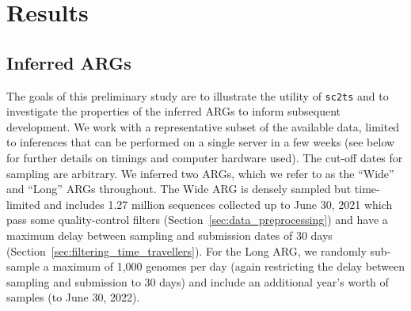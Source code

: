 \documentclass{article}
\begin{document}
\section{Results}
\subsection{Inferred ARGs}
The goals of this preliminary study are to illustrate the utility of
\texttt{sc2ts} and to investigate the properties of the
inferred ARGs to inform subsequent development.
We work with a
representative subset of the available data, limited to
inferences that can be performed on a single server in
a few weeks (see below for further details on timings and
computer hardware used). The cut-off dates for sampling
are arbitrary.
We inferred two ARGs, which we refer to as the
``Wide'' and ``Long'' ARGs throughout.
The Wide ARG is densely sampled but time-limited and
includes 1.27 million sequences collected up to June 30, 2021
which
pass some quality-control filters (Section~\ref{sec:data_preprocessing})
and  have a maximum delay between sampling and submission dates of 30 days
(Section~\ref{sec:filtering_time_travellers}).
For the Long ARG, we randomly sub-sample a maximum of 1,000 genomes per
day (again restricting the delay between sampling and submission to 30 days)
and include an additional year's worth of samples (to June 30, 2022).
\end{document}

